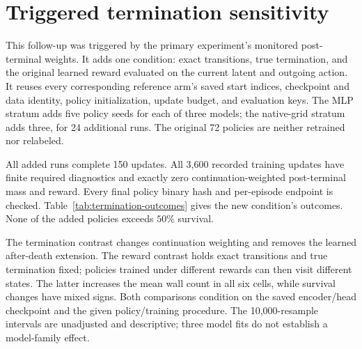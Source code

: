 \section{Triggered termination sensitivity}
\label{app:termination}

This follow-up was triggered by the primary experiment's monitored post-terminal weights. It adds
one condition: exact transitions, true termination, and the original learned reward evaluated on
the current latent and outgoing action. It reuses every corresponding reference arm's saved start
indices, checkpoint and data identity, policy initialization, update budget, and evaluation keys.
The MLP stratum adds five policy seeds for each of three models; the native-grid stratum adds three,
for 24 additional runs. The original 72 policies are neither retrained nor relabeled.

All added runs complete 150 updates. All 3,600 recorded training updates have finite required
diagnostics and exactly zero continuation-weighted post-terminal mass and reward. Every final
policy binary hash and per-episode endpoint is checked. Table~\ref{tab:termination-outcomes} gives
the new condition's outcomes. None of the added policies exceeds $50\%$ survival.

\begin{table}[ht]
\centering
\caption{Exact transitions, true termination, and fitted reward: the added termination-sensitivity
condition. Mean $\pm$ sample standard deviation over paired policy seeds within one fixed model and
torso. The two torso strata remain separate.}
\label{tab:termination-outcomes}
\end{table}

\begin{table}[ht]
\centering
\caption{Wall-count changes in the triggered sensitivity. ``True termination'' compares the new
condition with exact transitions and fitted reward/termination. ``True reward'' compares exact
transitions and true reward/termination with the new condition. Each entry gives the paired mean
and its conditional 95\% policy-seed bootstrap interval.}
\label{tab:termination-contrasts}
\end{table}

The termination contrast changes continuation weighting and removes the learned after-death
extension. The reward contrast holds exact transitions and true termination fixed; policies trained
under different rewards can then visit different states. The latter increases the mean wall count
in all six cells, while survival changes have mixed signs. Both comparisons condition on the saved
encoder/head checkpoint and the given policy/training procedure. The 10,000-resample intervals are
unadjusted and descriptive; three model fits do not establish a model-family effect.
